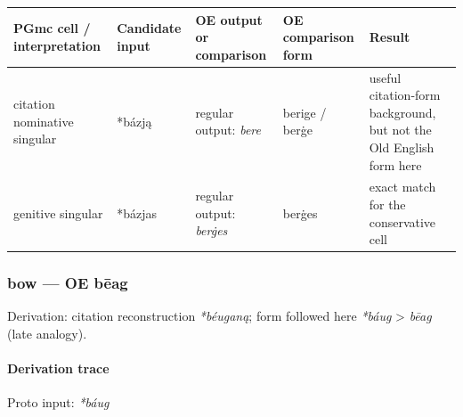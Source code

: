 \documentclass[
  british,
  a4paper,
]{article}
\newcounter{none} %
\begin{document}
{\def\LTcaptype{none} %
\begin{longtable}[]{@{}
  >{\raggedright\arraybackslash}p{}
  >{\raggedright\arraybackslash}p{}
  >{\raggedright\arraybackslash}p{}
  >{\raggedright\arraybackslash}p{}
  >{\raggedright\arraybackslash}p{}@{}}
\toprule\noalign{}
\begin{minipage}[b]{\linewidth}\raggedright
PGmc cell / interpretation
\end{minipage} & \begin{minipage}[b]{\linewidth}\raggedright
Candidate input
\end{minipage} & \begin{minipage}[b]{\linewidth}\raggedright
OE output or comparison
\end{minipage} & \begin{minipage}[b]{\linewidth}\raggedright
OE comparison form
\end{minipage} & \begin{minipage}[b]{\linewidth}\raggedright
Result
\end{minipage} \\
\midrule\noalign{}
\endhead
\bottomrule\noalign{}
\endlastfoot
citation nominative singular & *bázją & regular output: \emph{bere} &
berige / berġe & useful citation-form background, but not the Old
English form here \\
genitive singular & *bázjas & regular output: \emph{berġes} & berġes &
exact match for the conservative cell \\
\end{longtable}
}

\subsubsection{bow --- OE bēag}\label{bow-oe-bux113ag}

Derivation: citation reconstruction \emph{*béuganą}; form followed here
\emph{*báug} \textgreater{} \emph{bēag} (late analogy).

\paragraph{Derivation trace}\label{derivation-trace-41}

Proto input: \emph{*báug}
\end{document}
